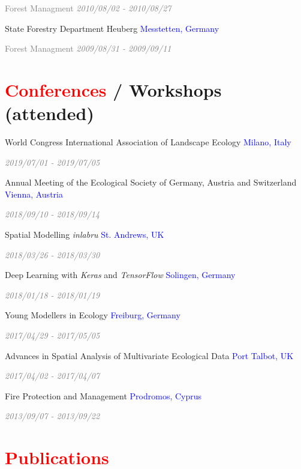 \documentclass[hidelinks]{report}
\begin{document}
\textcolor{grey}{\footnotesize{Forest Managment}}
\hfill
\textcolor{grey}{\textit{2010/08/02 - 2010/08/27}}

State Forestry Department Heuberg
\hfill
\textcolor{blue}{Messtetten, Germany}

\textcolor{grey}{\footnotesize{Forest Managment}}
\hfill
\textcolor{grey}{\textit{2009/08/31 - 2009/09/11}}



\section*{\textcolor{red}{Conferences} / Workshops \footnotesize{(attended)} \sout{\hfill}}

World Congress International Association of Landscape Ecology
\hfill
\textcolor{blue}{Milano, Italy}

\hfill
\textcolor{grey}{\textit{2019/07/01 - 2019/07/05}}

Annual Meeting of the Ecological Society of Germany, Austria and Switzerland
\hfill
\textcolor{blue}{Vienna, Austria}

\hfill
\textcolor{grey}{\textit{2018/09/10 - 2018/09/14}}

Spatial Modelling \textit{inlabru}
\hfill
\textcolor{blue}{St. Andrews, UK}

\hfill
\textcolor{grey}{\textit{2018/03/26 - 2018/03/30}}

Deep Learning with \textit{Keras} and \textit{TensorFlow}
\hfill
\textcolor{blue}{Solingen, Germany}

\hfill
\textcolor{grey}{\textit{2018/01/18 - 2018/01/19}}

Young Modellers in Ecology
\hfill
\textcolor{blue}{Freiburg, Germany}

\hfill
\textcolor{grey}{\textit{2017/04/29 - 2017/05/05}}

Advances in Spatial Analysis of Multivariate Ecological Data
\hfill
\textcolor{blue}{Port Talbot, UK}

\hfill
\textcolor{grey}{\textit{2017/04/02 - 2017/04/07}}

Fire Protection and Management
\hfill
\textcolor{blue}{Prodromos, Cyprus}

\hfill
\textcolor{grey}{\textit{2013/09/07 - 2013/09/22}}


\section*{\textcolor{red}{Publications} \sout{\hfill}}
\end{document}

